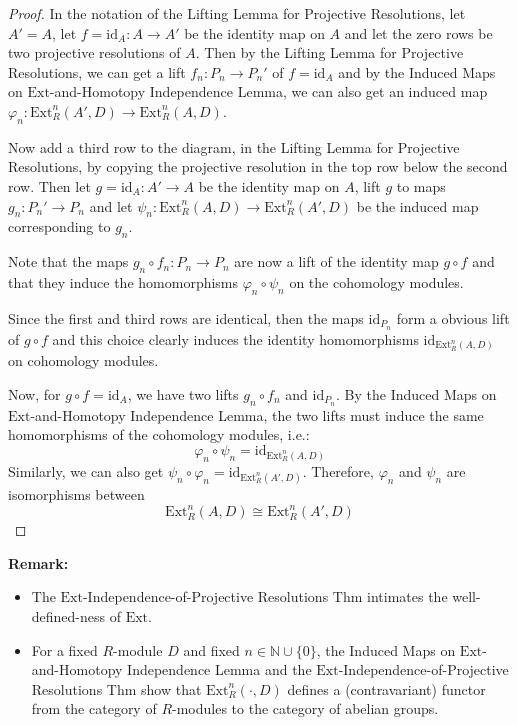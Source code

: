 \begin{proof}
    In the notation of the Lifting Lemma for Projective Resolutions, let $A'=A$, let $f=\text{id}_A :A\to A'$ be the identity map on $A$ and let the zero rows be two projective resolutions of $A$. Then by the Lifting Lemma for Projective Resolutions, we can get a lift $f_n:P_n \to P_n'$ of $f=\text{id}_A$ and by the Induced Maps on $\text{Ext}$-and-Homotopy Independence Lemma, we can also get an induced map $\varphi_n: \text{Ext}_R^n (A',D) \to \text{Ext}_R^n(A,D)$.

    Now add a third row to the diagram, in the Lifting Lemma for Projective Resolutions, by copying the projective resolution in the top row below the second row. Then let $g=\text{id}_A: A'\to A$ be the identity map on $A$, lift $g$ to maps $g_n: P_n'\to P_n$ and let $\psi_n: \text{Ext}_R^n (A,D) \to \text{Ext}_R^n (A',D)$ be the induced map corresponding to $g_n$.

    Note that the maps $g_n\circ f_n:P_n\to P_n$ are now a lift of the identity map $g \circ f$ and that they induce the homomorphisms $\varphi_n \circ \psi_n$ on the cohomology modules.

    Since the first and third rows are identical, then the maps $\text{id}_{P_n}$ form a obvious lift of $g\circ f$ and this choice clearly induces the identity homomorphisms $\text{id}_{\text{Ext}_R^n (A,D)}$ on cohomology modules.

    Now, for $g \circ f=\text{id}_A$, we have two lifts $g_n\circ f_n$ and $\text{id}_{P_n}$. By the Induced Maps on $\text{Ext}$-and-Homotopy Independence Lemma, the two lifts must induce the same homomorphisms of the cohomology modules, i.e.:
    \[
    \varphi_n \circ \psi_n= \text{id}_{\text{Ext}_R^n (A,D)}
    \]
    Similarly, we can also get $\psi_n \circ \varphi_n= \text{id}_{\text{Ext}_R^n (A',D)}$. Therefore, $\varphi_n$ and $\psi_n$ are isomorphisms between
    \[
    \text{Ext}_R^n (A,D) \cong \text{Ext}_R^n (A',D)
    \]
\end{proof}


\noindent\textbf{Remark:} \begin{itemize}
    \item The $\text{Ext}$-Independence-of-Projective Resolutions Thm intimates the well-defined-ness of $\text{Ext}$.
    \item For a fixed $R$-module $D$ and fixed $n \in \mathbb{N} \cup \{0\}$, the Induced Maps on $\text{Ext}$-and-Homotopy Independence Lemma and the $\text{Ext}$-Independence-of-Projective Resolutions Thm show that $\text{Ext}_R^n (\cdot, D)$ defines a (contravariant) functor from the category of $R$-modules to the category of abelian groups.
\end{itemize}

